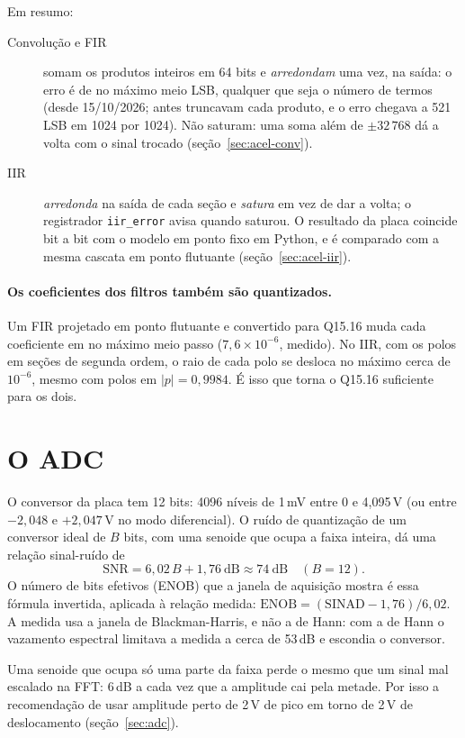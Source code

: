 Em resumo:

\begin{description}
  \item[Convolução e FIR] somam os produtos inteiros em 64 bits e
    \emph{arredondam} uma vez, na saída: o erro é de no máximo meio LSB, qualquer
    que seja o número de termos (desde 15/10/2026; antes truncavam cada produto,
    e o erro chegava a 521 LSB em 1024 por 1024). Não saturam: uma soma além de
    \(\pm 32\,768\) dá a volta com o sinal trocado
    (seção~\ref{sec:acel-conv}).
  \item[IIR] \emph{arredonda} na saída de cada seção e \emph{satura} em vez de
    dar a volta; o registrador \texttt{iir\_error} avisa quando saturou. O
    resultado da placa coincide bit a bit com o modelo em ponto fixo em Python,
    e é comparado com a mesma cascata em ponto flutuante
    (seção~\ref{sec:acel-iir}).
\end{description}

\paragraph{Os coeficientes dos filtros também são quantizados.} Um FIR
projetado em ponto flutuante e convertido para Q15.16 muda cada coeficiente em
no máximo meio passo (\(7{,}6\times10^{-6}\), medido). No IIR, com os polos em
seções de segunda ordem, o raio de cada polo se desloca no máximo cerca de
\(10^{-6}\), mesmo com polos em \(|p| = 0{,}9984\). É isso que torna o Q15.16
suficiente para os dois.

\section{O ADC}

O conversor da placa tem 12 bits: 4096 níveis de 1\,mV entre 0 e 4,095\,V (ou
entre \(-2{,}048\) e \(+2{,}047\)\,V no modo diferencial). O ruído de
quantização de um conversor ideal de \(B\) bits, com uma senoide que ocupa a
faixa inteira, dá uma relação sinal-ruído de
\[
  \mathrm{SNR} = 6{,}02\,B + 1{,}76\ \text{dB} \approx 74\ \text{dB}
  \quad (B = 12).
\]
O número de bits efetivos (ENOB) que a janela de aquisição mostra é essa
fórmula invertida, aplicada à relação medida:
\(\mathrm{ENOB} = (\mathrm{SINAD} - 1{,}76)/6{,}02\). A medida usa a janela de
Blackman-Harris, e não a de Hann: com a de Hann o vazamento espectral limitava
a medida a cerca de 53\,dB e escondia o conversor.

Uma senoide que ocupa só uma parte da faixa perde o mesmo que um sinal mal
escalado na FFT: 6\,dB a cada vez que a amplitude cai pela metade. Por isso a
recomendação de usar amplitude perto de 2\,V de pico em torno de 2\,V de
deslocamento (seção~\ref{sec:adc}).

